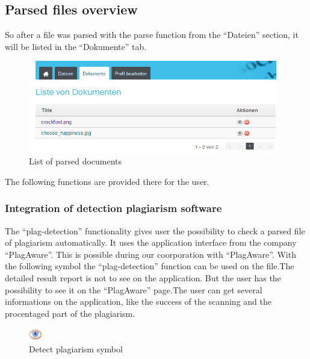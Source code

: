 \subsection{Parsed files overview}\label{sec:parse-file}

So after a file was parsed with the parse function from the \enquote{Dateien} section, it will be listed in the 
\enquote{Dokumente} tab.

\begin{figure}[!ht]
  \centering
    \includegraphics[width=0.97\textwidth]{images/basic_functionalities/dokumente.png}
  \caption{List of parsed documents}
  \label{fig: List of parsed documents}
\end{figure}

The following functions are provided there for the user.

\subsubsection{Integration of detection plagiarism software}

The \enquote{plag-detection} functionality gives user the possibility to check a parsed file of plagiarism automatically. 
It uses the application interface from the company \enquote{PlagAware}. This is possible during our coorporation with 
\enquote{PlagAware}.
With the following symbol the \enquote{plag-detection} function can be used on the file.The detailed result report is 
not to see on the application. But the user has the possibility to see it on the \enquote{PlagAware} page.The user can get 
several informations on the application, like the success of the scanning and the procentaged part of the plagiarism.

\begin{figure}[!ht]
  \centering
    \includegraphics[width=0.05\textwidth]{images/eye.png}
  \caption{Detect plagiarism symbol}
  \label{fig:detect plagiarism symbol}
\end{figure}


